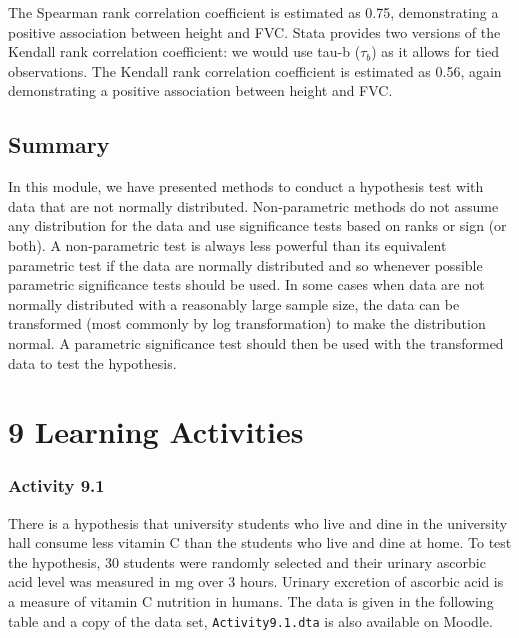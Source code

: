 \documentclass[
]{memoir}
\begin{document}
The Spearman rank correlation coefficient is estimated as 0.75, demonstrating a positive association between height and FVC.
Stata provides two versions of the Kendall rank correlation coefficient: we would use tau-b (\(\tau_b\)) as it allows for tied observations. The Kendall rank correlation coefficient is estimated as 0.56, again demonstrating a positive association between height and FVC.

\hypertarget{summary-1}{%
\section{Summary}\label{summary-1}}

In this module, we have presented methods to conduct a hypothesis test with data that are not normally distributed. Non-parametric methods do not assume any distribution for the data and use significance tests based on ranks or sign (or both). A non-parametric test is always less powerful than its equivalent parametric test if the data are normally distributed and so whenever possible parametric significance tests should be used. In some cases when data are not normally distributed with a reasonably large sample size, the data can be transformed (most commonly by log transformation) to make the distribution normal. A parametric significance test should then be used with the transformed data to test the hypothesis.

\hypertarget{learning-activities-8}{%
\chapter*{\texorpdfstring{\textbf{9} Learning Activities}{9 Learning Activities}}\label{learning-activities-8}}

\hypertarget{activity-9.1}{%
\subsection*{Activity 9.1}\label{activity-9.1}}

There is a hypothesis that university students who live and dine in the university hall consume less vitamin C than the students who live and dine at home. To test the hypothesis, 30 students were randomly selected and their urinary ascorbic acid level was measured in mg over 3 hours. Urinary excretion of ascorbic acid is a measure of vitamin C nutrition in humans. The data is given in the following table and a copy of the data set, \texttt{Activity9.1.dta} is also available on Moodle.
\end{document}
